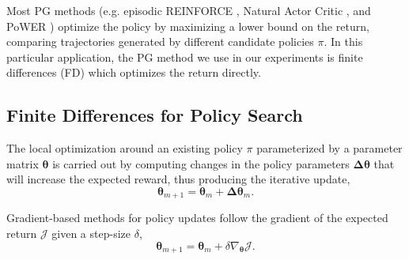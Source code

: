 \documentclass{aamas2016}
\begin{document}
Most PG methods (e.g. episodic REINFORCE \cite{williams1992simple}, Natural Actor 
Critic \cite{peters2008natural}, and PoWER \cite{kober2009policy}) optimize the policy by maximizing a lower bound on the return, 
comparing trajectories generated by different candidate policies $\pi$. 
In this particular application, the PG method we use in our experiments is finite differences (FD) \cite{Bagnell-2013} 
which optimizes the return directly.

\subsection{Finite Differences for Policy Search}
The local optimization around an existing policy $\pi$ parameterized by a parameter matrix $\boldsymbol{\theta}$ 
is carried out by computing changes in the policy parameters $\boldsymbol{\Delta \theta}$ that will increase the expected reward, thus
producing the iterative update,
\begin{displaymath}
 \boldsymbol{\theta}_{m+1} = \boldsymbol{\theta}_{m}+\boldsymbol{\Delta \theta}_{m}.
\end{displaymath}


Gradient-based methods for policy updates follow the gradient of the expected return $\mathcal{J}$ %
given a step-size $\delta$,
\begin{displaymath}
 \boldsymbol{\theta}_{m+1} = \boldsymbol{\theta}_{m}+\delta\nabla_{\boldsymbol{\theta}}\mathcal{J}.
\end{displaymath}
\end{document}

